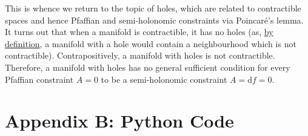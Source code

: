 \documentclass[oneside]{book}
\newcommand{\dif}{\text{d}}
\begin{document}


This is whence we return to the topic of holes, which are related to contractible spaces and hence Pfaffian and semi-holonomic constraints via Poincar\'{e}'s lemma. It turns out that when a manifold is contractible, it has no holes (as, \hyperref[hole_defn]{by definition}, a manifold with a hole would contain a neighbourhood which is not contractible). Contrapositively, a manifold with holes is not contractible. Therefore, a manifold with holes has no general sufficient condition for every Pfaffian constraint $A = 0$ to be  a semi-holonomic constraint $A = \dif f = 0$.

\chapter{Appendix B: Python Code}

\newpage

\setcounter{page}{57}

\nocite{*}


\end{document}
